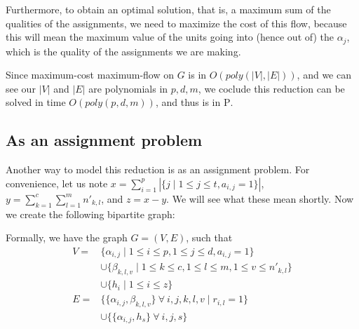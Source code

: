 Furthermore, to obtain an optimal solution, that is, a maximum sum of the qualities of the assignments, we need to maximize the cost of this flow, because this will mean the maximum value of the units going into (hence out of) the $\alpha_j$, which is the quality of the assignments we are making.

Since maximum-cost maximum-flow on $G$ is in $O(poly(|V|, |E|))$, and we can see our $|V|$ and $|E|$ are polynomials in $p, d, m$, we coclude this reduction can be solved in time $O(poly(p, d, m))$, and thus is in \textsc{P}.

\subsection{As an assignment problem}

Another way to model this reduction is as an assignment problem. For convenience, let us note $x = \sum_{i = 1}^p |\{j \mid 1 \le j \le t, a_{i, j} = 1\}|$, $y = \sum_{k = 1}^c \sum_{l = 1}^m n'_{k, l}$, and $z = x - y$. We will see what these mean shortly. Now we create the following bipartite graph:

\begin{center}
\end{center}

Formally, we have the graph $G = (V, E)$, such that
\begin{align*}
V = & \{\alpha_{i, j} \mid 1 \le i \le p, 1 \le j \le d, a_{i, j} = 1\}\\
    & \cup \{\beta_{k, l, v} \mid 1 \le k \le c, 1 \le l \le m, 1 \le v \le n'_{k, l}\}\\
    & \cup \{h_i \mid 1 \le i \le z\}\\
E = & \{\{\alpha_{i, j}, \beta_{k, l, v}\}\ \forall\ i, j, k, l, v \mid r_{i, l} = 1\}\\
    & \cup \{\{\alpha_{i, j}, h_s\}\ \forall\ i, j, s\}
\end{align*}


